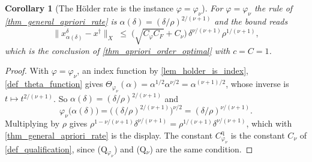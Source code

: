 \documentclass[a4paper]{report}
\theoremstyle{plain}
\newtheorem{corollary}[theorem]{Corollary}
\theoremstyle{definition}
\theoremstyle{remark}
\newcommand{\dg}{^{\dagger}}
\begin{document}
\begin{corollary}[The H\"older rate is the instance $\varphi = \varphi_{\nu}$]
  \label{cor_general_holder_rate}
  For $\varphi = \varphi_{\nu}$ the rule of \cref{thm_general_apriori_rate} is
  $\alpha(\delta) = (\delta/\rho)^{2/(\nu+1)}$ and the bound reads
  \[
    \|x^{\delta}_{\alpha(\delta)} - x\dg\|_X \;\le\;
      \bigl(\sqrt{C_{\varphi}C_F} + C_{\nu}\bigr)\,
      \delta^{\nu/(\nu+1)}\rho^{1/(\nu+1)} ,
  \]
  which is the conclusion of \cref{thm_apriori_order_optimal} with $c = C = 1$.
\end{corollary}
\begin{proof}
  With $\varphi = \varphi_{\nu}$, an index function by \cref{lem_holder_is_index},
  \cref{def_theta_function} gives
  $\Theta_{\varphi_{\nu}}(\alpha) = \alpha^{1/2}\alpha^{\nu/2} = \alpha^{(\nu+1)/2}$,
  whose inverse is $t \mapsto t^{2/(\nu+1)}$.  So
  $\alpha(\delta) = (\delta/\rho)^{2/(\nu+1)}$ and
  \[
    \varphi_{\nu}\bigl(\alpha(\delta)\bigr)
      = \bigl((\delta/\rho)^{2/(\nu+1)}\bigr)^{\nu/2}
      = (\delta/\rho)^{\nu/(\nu+1)} .
  \]
  Multiplying by $\rho$ gives
  $\rho^{1-\nu/(\nu+1)}\delta^{\nu/(\nu+1)} = \rho^{1/(\nu+1)}\delta^{\nu/(\nu+1)}$, which
  with \cref{thm_general_apriori_rate} is the display.  The constant
  $C^{\mathrm{q}}_{\varphi_{\nu}}$ is the constant $C_{\nu}$ of
  \cref{def_qualification}, since (Q$_{\varphi_{\nu}}$) and (Q$_{\nu}$) are the same
  condition.
\end{proof}
\end{document}

